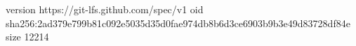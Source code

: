 version https://git-lfs.github.com/spec/v1
oid sha256:2ad379e799b81c092e5035d35d0fae974db8b6d3ce6903b9b3e49d83728df84e
size 12214
